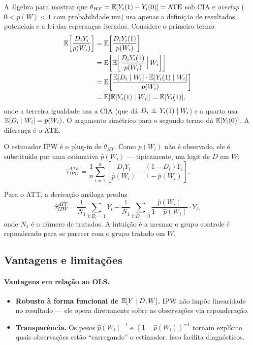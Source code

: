 A álgebra para mostrar que $\theta_{HT} = \mathbb{E}[Y_i(1) - Y_i(0)] = \text{ATE}$ sob CIA e \textit{overlap} ($0 < p(W) < 1$ com probabilidade um) usa apenas a definição de resultados potenciais e a lei das esperanças iteradas. Considere o primeiro termo:
\begin{align*}
\mathbb{E}\!\left[\frac{D_i Y_i}{p(W_i)}\right]
  &= \mathbb{E}\!\left[\frac{D_i Y_i(1)}{p(W_i)}\right] \\
  &= \mathbb{E}\!\left[\mathbb{E}\!\left[\frac{D_i Y_i(1)}{p(W_i)} \,\Big|\, W_i\right]\right] \\
  &= \mathbb{E}\!\left[\frac{\mathbb{E}[D_i \mid W_i] \cdot \mathbb{E}[Y_i(1) \mid W_i]}{p(W_i)}\right] \\
  &= \mathbb{E}[\mathbb{E}[Y_i(1) \mid W_i]] = \mathbb{E}[Y_i(1)],
\end{align*}
onde a terceira igualdade usa a CIA (que dá $D_i \perp\!\!\!\perp Y_i(1) \mid W_i$) e a quarta usa $\mathbb{E}[D_i \mid W_i] = p(W_i)$. O argumento simétrico para o segundo termo dá $\mathbb{E}[Y_i(0)]$. A diferença é o ATE.

O estimador IPW é o plug-in de $\theta_{HT}$. Como $p(W_i)$ não é observado, ele é substituído por uma estimativa $\hat{p}(W_i)$ --- tipicamente, um logit de $D$ em $W$:
\begin{equation}
\hat{\tau}_{IPW}^{ATE} = \frac{1}{n} \sum_{i=1}^n \!\left[\frac{D_i Y_i}{\hat{p}(W_i)} - \frac{(1 - D_i) Y_i}{1 - \hat{p}(W_i)}\right].
\label{eq:ipw-ate}
\end{equation}

Para o ATT, a derivação análoga produz
\begin{equation}
\hat{\tau}_{IPW}^{ATT} = \frac{1}{N_1} \sum_{i: D_i = 1} Y_i - \frac{1}{N_1} \sum_{i: D_i = 0} \frac{\hat{p}(W_i)}{1 - \hat{p}(W_i)} \cdot Y_i,
\label{eq:ipw-att}
\end{equation}
onde $N_1$ é o número de tratados. A intuição é a mesma: o grupo controle é reponderado para se parecer com o grupo tratado em $W$.

\subsection*{Vantagens e limitações}

\paragraph{Vantagens em relação ao OLS.}
\begin{itemize}
  \item \textbf{Robusto à forma funcional de $\mathbb{E}[Y \mid D, W]$.} IPW não impõe linearidade no resultado --- ele opera diretamente sobre as observações via reponderação.
  \item \textbf{Transparência.} Os pesos $\hat{p}(W_i)^{-1}$ e $(1 - \hat{p}(W_i))^{-1}$ tornam explícito quais observações estão ``carregando'' o estimador. Isso facilita diagnósticos.
\end{itemize}

